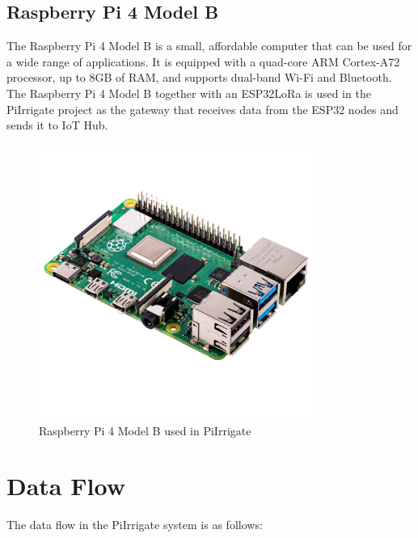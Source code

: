 \subsection{Raspberry Pi 4 Model B}
The Raspberry Pi 4 Model B is a small, affordable computer that can be used for a wide range of applications.
It is equipped with a quad-core ARM Cortex-A72 processor, up to 8GB of RAM, and supports dual-band Wi-Fi and Bluetooth.
The Raspberry Pi 4 Model B together with an ESP32LoRa is used in the PiIrrigate project as the gateway that receives data from the ESP32 nodes
and sends it to IoT Hub.
\begin{figure}[H]
    \centering
    \includegraphics[width=0.8\textwidth]{images/raspberrypi.jpg}
    \caption{Raspberry Pi 4 Model B used in PiIrrigate}
    \label{fig:raspberrypi}
\end{figure}

\section{Data Flow}
The data flow in the PiIrrigate system is as follows:

